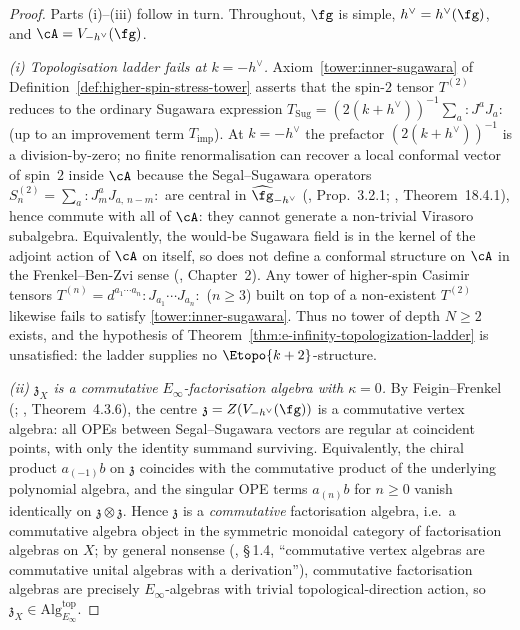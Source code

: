 \begin{proof}
Parts (i)--(iii) follow in turn. Throughout, $\fg$ is simple,
$h^\vee = h^\vee(\fg)$, and $\cA = V_{-h^\vee}(\fg)$.

\emph{(i) Topologisation ladder fails at $k=-h^\vee$.}
Axiom~\ref{tower:inner-sugawara} of
Definition~\ref{def:higher-spin-stress-tower} asserts that the
spin-$2$ tensor $T^{(2)}$ reduces to the ordinary Sugawara
expression $T_{\mathrm{Sug}} = (2(k+h^\vee))^{-1}\sum_a
{:}J^a J_a{:}$ (up to an improvement term
$T_{\mathrm{imp}}$). At $k=-h^\vee$ the prefactor $(2(k+h^\vee))^{-1}$
is a division-by-zero; no finite renormalisation can recover a
local conformal vector of spin~$2$ inside $\cA$ because the
Segal--Sugawara operators $S^{(2)}_n = \sum_a {:}J^a_m J_{a,\,n-m}{:}$
are central in $\widehat{\fg}_{-h^\vee}$ (\cite{FrenkelLanglands},
Prop.~3.2.1; \cite{FBZ04}, Theorem~18.4.1), hence commute with all
of $\cA$: they cannot generate a non-trivial Virasoro subalgebra.
Equivalently, the would-be Sugawara field is in the kernel of the
adjoint action of $\cA$ on itself, so does not define a conformal
structure on $\cA$ in the Frenkel--Ben-Zvi sense (\cite{FBZ04},
Chapter~2). Any tower of higher-spin Casimir tensors
$T^{(n)} = d^{a_1\cdots a_n}{:}J_{a_1}\cdots J_{a_n}{:}$ ($n \ge 3$)
built on top of a non-existent $T^{(2)}$ likewise fails to satisfy
\ref{tower:inner-sugawara}. Thus no tower of depth $N \ge 2$
exists, and the hypothesis of
Theorem~\ref{thm:e-infinity-topologization-ladder} is unsatisfied:
the ladder supplies no $\Etopo{k+2}$-structure.

\emph{(ii) $\mathfrak{z}_X$ is a commutative $E_\infty$-factorisation
algebra with $\kappa = 0$.} By Feigin--Frenkel (\cite{Feigin-Frenkel};
\cite{FrenkelLanglands}, Theorem~4.3.6), the centre
$\mathfrak{z} = Z(V_{-h^\vee}(\fg))$ is a commutative vertex algebra:
all OPEs between Segal--Sugawara vectors are regular at coincident
points, with only the identity summand surviving. Equivalently, the
chiral product $a_{(-1)}b$ on $\mathfrak{z}$ coincides with the
commutative product of the underlying polynomial algebra, and the
singular OPE terms $a_{(n)}b$ for $n \ge 0$ vanish identically on
$\mathfrak{z} \otimes \mathfrak{z}$. Hence $\mathfrak{z}$ is a
\emph{commutative} factorisation algebra, i.e.\ a commutative
algebra object in the symmetric monoidal category of
factorisation algebras on $X$; by general nonsense
(\cite{FBZ04}, \S\,1.4, ``commutative vertex algebras are
commutative unital algebras with a derivation''), commutative
factorisation algebras are precisely $E_\infty$-algebras with
trivial topological-direction action, so
$\mathfrak{z}_X \in \mathrm{Alg}_{E_\infty}^{\mathrm{top}}$.


\end{proof}
